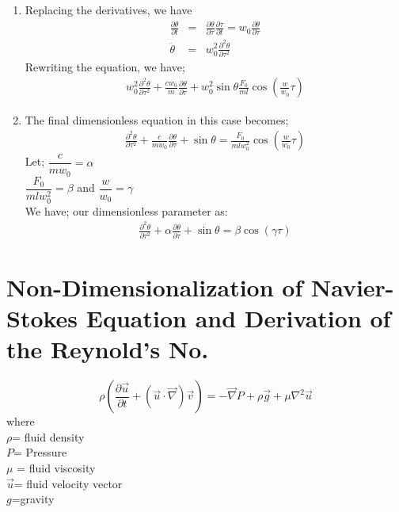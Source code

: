 \documentclass[11pt]{report}
\newcommand{\sps}{\\[0.2cm]}
\begin{document}
\begin{enumerate}
		\item Replacing the derivatives, we have
		\begin{eqnarray*}
			\frac{\partial \theta}{\partial t} &=& \frac{\partial \theta}{\partial \tau} \frac{\partial \tau}{\partial t} = w_0\frac{\partial \theta}{\partial \tau}\sps
			\ddot{\theta} &=& w_0^2\frac{\partial^2\theta}{\partial \tau^2}
		\end{eqnarray*}
		Rewriting the equation, we have;
		\begin{eqnarray*}
			w_0^2 \frac{\partial^2\theta}{\partial\tau^2} + \frac{cw_0}{m}\frac{\partial \theta}{\partial \tau} + w_0^2 \sin\theta\frac{F_0}{ml}\cos\left(\frac{w}{w_0}\tau\right)
		\end{eqnarray*}
		\item The final dimensionless equation in this case becomes;
		\begin{eqnarray*}
			\frac{\partial^2 \theta}{\partial \tau^2} + \frac{c}{mw_0}\frac{\partial\theta}{\partial\tau} + \sin\theta = \frac{F_0}{mlw_0^2}\cos\left(\frac{w}{w_0}\tau\right)
		\end{eqnarray*}
		Let; $\dfrac{c}{mw_0}=\alpha$\sps
		$\dfrac{F_0}{mlw_0^2} = \beta $ and $\dfrac{w}{w_0} = \gamma$\sps
		We have; our dimensionless parameter as:
		\begin{eqnarray*}
			\frac{\partial^2\theta}{\partial \tau^2} + \alpha \frac{\partial\theta}{\partial\tau} + \sin \theta = \beta\cos(\gamma\tau)
		\end{eqnarray*}
	\end{enumerate}
	
	\section{Non-Dimensionalization of Navier-Stokes Equation and Derivation of the Reynold's No.}
	\begin{equation*}
		\rho\left(\frac{\partial\vec{u}}{\partial t} + \left(\vec{u}\cdot \vec{\nabla}\right)\vec{v}\right) = -\vec{\nabla}P + \rho \vec{g} + \mu \nabla^2 \vec{u}
	\end{equation*}
	where\\
	$\rho$= fluid density\\
	$P$= Pressure\\
	$\mu$ = fluid viscosity\\
	$\vec{u}$= fluid velocity vector\\
	$g$=gravity\\
	
\end{document}
